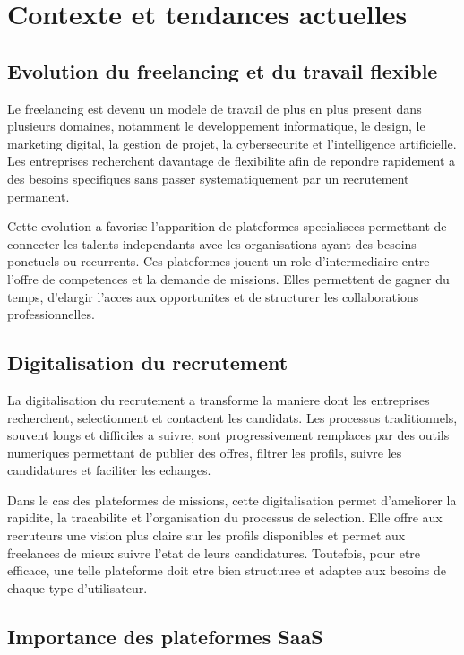 \section{Contexte et tendances actuelles}

\subsection{Evolution du freelancing et du travail flexible}

Le freelancing est devenu un modele de travail de plus en plus present dans plusieurs domaines, notamment le developpement informatique, le design, le marketing digital, la gestion de projet, la cybersecurite et l'intelligence artificielle. Les entreprises recherchent davantage de flexibilite afin de repondre rapidement a des besoins specifiques sans passer systematiquement par un recrutement permanent.

Cette evolution a favorise l'apparition de plateformes specialisees permettant de connecter les talents independants avec les organisations ayant des besoins ponctuels ou recurrents. Ces plateformes jouent un role d'intermediaire entre l'offre de competences et la demande de missions. Elles permettent de gagner du temps, d'elargir l'acces aux opportunites et de structurer les collaborations professionnelles.

\subsection{Digitalisation du recrutement}

La digitalisation du recrutement a transforme la maniere dont les entreprises recherchent, selectionnent et contactent les candidats. Les processus traditionnels, souvent longs et difficiles a suivre, sont progressivement remplaces par des outils numeriques permettant de publier des offres, filtrer les profils, suivre les candidatures et faciliter les echanges.

Dans le cas des plateformes de missions, cette digitalisation permet d'ameliorer la rapidite, la tracabilite et l'organisation du processus de selection. Elle offre aux recruteurs une vision plus claire sur les profils disponibles et permet aux freelances de mieux suivre l'etat de leurs candidatures. Toutefois, pour etre efficace, une telle plateforme doit etre bien structuree et adaptee aux besoins de chaque type d'utilisateur.

\subsection{Importance des plateformes SaaS}

